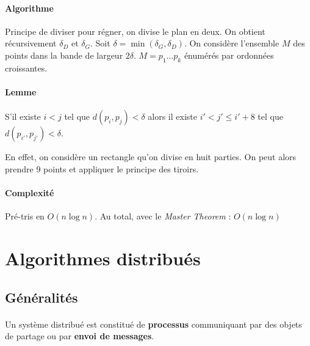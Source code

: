 \documentclass[french]{article}
\begin{document}
\paragraph{Algorithme}Principe de diviser pour régner, on divise le plan en deux. On obtient récursivement $\delta_D$ et $\delta_G$. Soit $\delta = \min (\delta_G, \delta_D)$. On considère l'ensemble $M$ des points dans la bande de largeur $2\delta$. $M = p_1 \ldots p_k$ énumérés par ordonnées croissantes.

\paragraph{Lemme}S'il existe $i < j$ tel que $d(p_i,p_j) < \delta$ alors il existe $i' < j' \leq i'+8$ tel que $d(p_{i'},p_{j'}) < \delta$.

En effet, on considère un rectangle qu'on divise en huit parties. On peut alors prendre 9 points et appliquer le principe des tiroirs.

\paragraph{Complexité} Pré-tris en $O(n \log n)$. Au total, avec le \emph{Master Theorem} : $O(n \log n)$

\section{Algorithmes distribués}

\subsection{Généralités}

\paragraph{}Un système distribué est constitué de \textbf{processus} communiquant par des objets de partage ou par \textbf{envoi de messages}.\\
\end{document}
